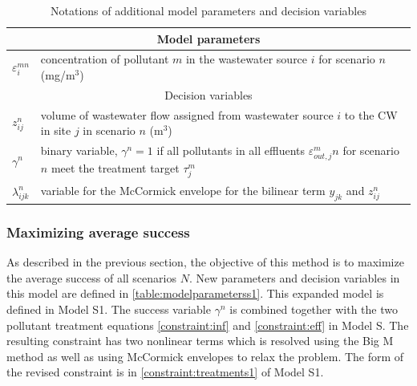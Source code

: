 \documentclass[preprint,12pt,authoryear]{elsarticle}
\begin{document}
\begin{table}[!htb]
	\setlength{\extrarowheight}{1.5mm}
	\caption{Notations of additional model parameters and decision variables}
	\begin{tabular}{|p{1.5cm} p{12.4cm}|}
		\hline
		\multicolumn{2}{|c|}{Model parameters} \\
		\hline
		$\varepsilon_i^{mn}$ & concentration of pollutant $m$ in the wastewater source $i$ for scenario $n$ (mg/m$^3$)\\
		\hline
		\multicolumn{2}{|c|}{Decision variables}\\
		\hline	
		$z_{ij}^n$ & volume of wastewater flow assigned from wastewater source $i$ to the CW in site $j$ in scenario $n$  (m$^3$)\\
		$\gamma^n$ & binary variable, $\gamma^n = 1$ if all pollutants in all effluents $\varepsilon_{out,j}^mn$ for scenario $n$ meet the treatment target $\tau_j^m$\\
		$\lambda_{ijk}^n$ & variable for the McCormick envelope for the bilinear term $y_{jk}$ and $z_{ij}^n$\\ 
		\hline	
	\end{tabular}
	\label{table:modelparameterss1}
\end{table}

\subsubsection{Maximizing average success}\label{subsect:maxsuccess}
As described in the previous section, the objective of this method is to maximize the average success of all scenarios $N$. New parameters and decision variables in this model are defined in \autoref{table:modelparameterss1}. This expanded model is defined in Model S1. The success variable $\gamma^n$ is combined together with the two pollutant treatment equations \ref{constraint:inf} and \ref{constraint:eff} in Model S. The resulting constraint has two nonlinear terms which is resolved using the Big M method as well as using McCormick envelopes to relax the problem. The form of the revised constraint is in \autoref{constraint:treatments1} of Model S1.
\end{document}
